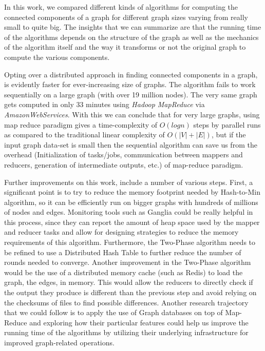 In this work, we compared different kinds of algorithms for computing the connected components of a graph for different graph sizes varying from really small to quite big. The insights that we can summarize are that the running time of the algorithms depends on the structure of the graph as well as the mechanics of the algorithm itself and the way it transforms or not the original graph to compute the various components.

Opting over a distributed approach in finding connected components in a graph, is evidently faster for ever-increasing size of graphs. The algorithm fails to work sequentially on a large graph (with over 19 million nodes). The very same graph gets computed in only 33 minutes using \textit{Hadoop MapReduce} via \textit{AmazonWebServices}. With this we can conclude that for very large graphs, using map reduce paradigm gives a time-complexity of \textit{$O(logn)$} steps by parallel runs as compared to the traditional linear complexity of \textit{$O(|V| + |E|)$}, but if the input graph data-set is small then the sequential algorithm can save us from the overhead  (\eg Initialization of tasks/jobs, communication between mappers and reducers, generation of intermediate outputs, etc.) of map-reduce paradigm.

Further improvements on this work, include a number of various steps. First, a significant point is to try to reduce the memory footprint needed by Hash-to-Min algorithm, so it can be efficiently run on bigger graphs with hundreds of millions of nodes and edges. Monitoring tools such as Ganglia could be really helpful in this process, since they can report the amount of heap space used by the mapper and reducer tasks and allow for designing strategies to reduce the memory requirements of this algorithm. Furthermore, the Two-Phase algorithm needs to be refined to use a Distributed Hash Table to further reduce the number of rounds needed to converge. Another improvement in the Two-Phase algorithm would be the use of a distributed memory cache (such as Redis) to load the graph, \ie the edges, in memory. This would allow the reducers to directly check if the output they produce is different than the previous step and avoid relying on the checksums of files to find possible differences. Another research trajectory that we could follow is to apply the use of Graph databases on top of Map-Reduce and exploring how their particular features could help us improve the running time of the algorithms by utilizing their underlying infrastructure for improved graph-related operations.